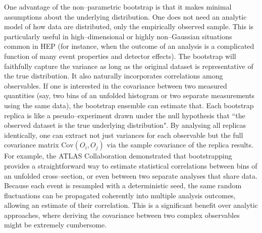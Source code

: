             One advantage of the non--parametric bootstrap is that it makes minimal assumptions about the underlying distribution.
            One does not need an analytic model of how data are distributed, only the empirically observed sample.
            This is particularly useful in high--dimensional or highly non--Gaussian situations common in HEP (for instance, when the outcome of an analysis is a complicated function of many event properties and detector effects).
            The bootstrap will faithfully capture the variance as long as the original dataset is representative of the true distribution.
            It also naturally incorporates correlations among observables.
            If one is interested in the covariance between two measured quantities (say, two bins of an unfolded histogram or two separate measurements using the same data), the bootstrap ensemble can estimate that.
            Each bootstrap replica is like a pseudo--experiment drawn under the null hypothesis that ``the observed dataset is the true underlying distribution".
            By analysing all replicas identically, one can extract not just variances for each observable but the full covariance matrix $\mathrm{Cov}(O_i, O_j)$ via the sample covariance of the replica results.
            For example, the ATLAS Collaboration demonstrated that bootstrapping provides a straightforward way to estimate statistical correlations between bins of an unfolded cross--section, or even between two separate analyses that share data.
            Because each event is resampled with a deterministic seed, the same random fluctuations can be propagated coherently into multiple analysis outcomes, allowing an estimate of their correlation.
            This is a significant benefit over analytic approaches, where deriving the covariance between two complex observables might be extremely cumbersome.

